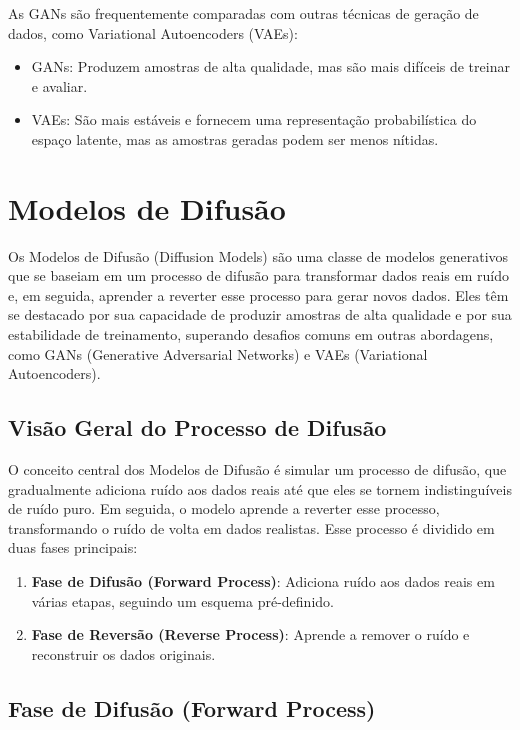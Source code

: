 \documentclass{article}
\begin{document}
As GANs são frequentemente comparadas com outras técnicas de geração de dados, como Variational Autoencoders (VAEs):
\begin{itemize}
    \item GANs: Produzem amostras de alta qualidade, mas são mais difíceis de treinar e avaliar.
    \item VAEs: São mais estáveis e fornecem uma representação probabilística do espaço latente, mas as amostras geradas podem ser menos nítidas.
\end{itemize}

\section{Modelos de Difusão}

Os Modelos de Difusão (Diffusion Models) são uma classe de modelos generativos que se baseiam em um processo de difusão para transformar dados reais em ruído e, em seguida, aprender a reverter esse processo para gerar novos dados. Eles têm se destacado por sua capacidade de produzir amostras de alta qualidade e por sua estabilidade de treinamento, superando desafios comuns em outras abordagens, como GANs (Generative Adversarial Networks) e VAEs (Variational Autoencoders).

\subsection{Visão Geral do Processo de Difusão}

O conceito central dos Modelos de Difusão é simular um processo de difusão, que gradualmente adiciona ruído aos dados reais até que eles se tornem indistinguíveis de ruído puro. Em seguida, o modelo aprende a reverter esse processo, transformando o ruído de volta em dados realistas. Esse processo é dividido em duas fases principais:
\begin{enumerate}
    \item \textbf{Fase de Difusão (Forward Process)}: Adiciona ruído aos dados reais em várias etapas, seguindo um esquema pré-definido.
    \item \textbf{Fase de Reversão (Reverse Process)}: Aprende a remover o ruído e reconstruir os dados originais.
\end{enumerate}

\subsection{Fase de Difusão (Forward Process)}
\end{document}
